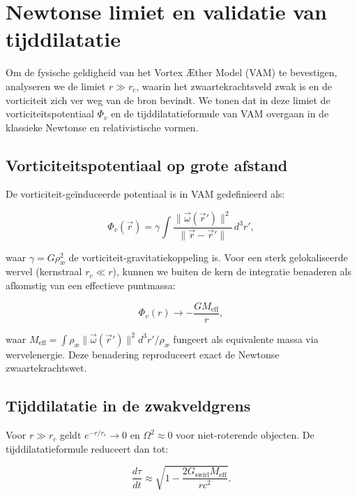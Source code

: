 
\section{Newtonse limiet en validatie van tijddilatatie}\label{sec:appendix_3}

Om de fysische geldigheid van het Vortex Æther Model (VAM) te bevestigen, analyseren we de limiet $r \gg r_c$, waarin het zwaartekrachtsveld zwak is en de vorticiteit zich ver weg van de bron bevindt. We tonen dat in deze limiet de vorticiteitspotentiaal $\Phi_v$ en de tijddilatatieformule van VAM overgaan in de klassieke Newtonse en relativistische vormen.

\subsection{Vorticiteitspotentiaal op grote afstand}

De vorticiteit-geïnduceerde potentiaal is in VAM gedefinieerd als:

\begin{equation}
\Phi_v(\vec{r}) = \gamma \int \frac{\|\vec{\omega}(\vec{r}')\|^2}{\|\vec{r} - \vec{r}'\|} \, d^3r',
\end{equation}

waar $\gamma = G \rho_\text{æ}^2$ de vorticiteit-gravitatiekoppeling is. Voor een sterk gelokaliseerde wervel (kernstraal $r_c \ll r$), kunnen we buiten de kern de integratie benaderen als afkomstig van een effectieve puntmassa:

\begin{equation}
\Phi_v(r) \to -\frac{G M_\text{eff}}{r},
\end{equation}

waar $M_\text{eff} = \int \rho_\text{æ} \|\vec{\omega}(\vec{r}')\|^2 d^3r' / \rho_\text{æ}$ fungeert als equivalente massa via wervelenergie. Deze benadering reproduceert exact de Newtonse zwaartekrachtswet.

\subsection{Tijddilatatie in de zwakveldgrens}

Voor $r \gg r_c$ geldt $e^{-r/r_c} \to 0$ en $\Omega^2 \approx 0$ voor niet-roterende objecten. De tijddilatatieformule reduceert dan tot:

\begin{equation}
\frac{d\tau}{dt} \approx \sqrt{1 - \frac{2 G_\text{swirl} M_\text{eff}}{r c^2}}.
\end{equation}

